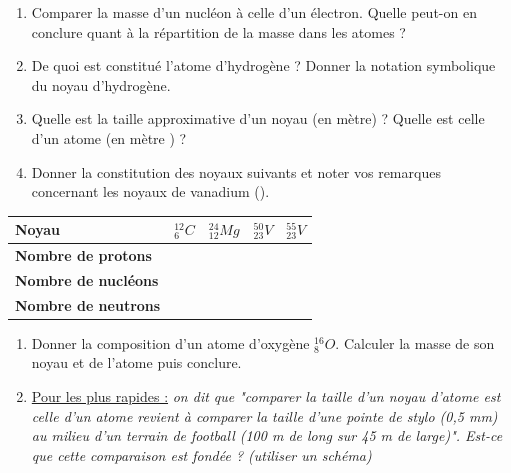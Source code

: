 \documentclass[a4paper,12pt,fleqn]{scrartcl}%
\begin{document}
\begin{enumerate}[resume]
	\item Comparer la masse d'un nucléon à celle d'un électron. Quelle peut-on en conclure quant à la répartition de la masse dans les atomes ?
	\item De quoi est constitué l'atome d'hydrogène ? Donner la notation symbolique du noyau d'hydrogène.
	\item Quelle est la taille approximative d'un noyau (en mètre) ? Quelle est celle d'un atome (en mètre ) ?
	\item Donner la constitution des noyaux suivants et noter vos remarques concernant les noyaux de vanadium ().
\end{enumerate}
\begin{center}
	\begin{tabular}{|>{\centering}m{4cm}|>{\centering}m{3cm}|>{\centering}m{3cm}|>{\centering}m{3cm}|>{\centering\arraybackslash}m{3cm}|}
	\hline
	\textbf{Noyau} & $^{12}_6C$ & $^{24}_{12}Mg$ &$^{50}_{23}V$ &$^{55}_{23}V$ \\
	\hline
	\textbf{Nombre de protons}&&&&\\
	\hline
	\textbf{Nombre de nucléons}&&&&\\
	\hline
	\textbf{Nombre de neutrons}&&&&\\
	\hline
\end{tabular}
\end{center}


\begin{enumerate}[resume]
	\item Donner la composition d'un atome d'oxygène $^{16}_8O$. Calculer la masse de son noyau et de l'atome puis conclure.
	\item \underline{Pour les plus rapides :} \emph{on dit que "comparer la taille d'un noyau d'atome est celle d'un atome revient à comparer la taille d'une pointe de stylo (0,5 mm) au milieu d'un terrain de football (100 m de long sur 45 m de large)". Est-ce que cette comparaison est fondée ? (utiliser un schéma)}
\end{enumerate}
\end{document}
